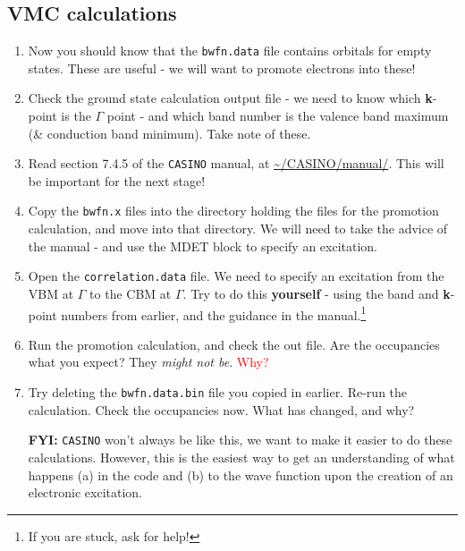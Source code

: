 \documentclass[12pt, a4paper]{article}
\begin{document}
\subsection{VMC calculations}\label{sub:vmc_calculations_2}

\begin{enumerate}
  \item Now you should know that the \texttt{bwfn.data} file contains orbitals
  for empty states. These are useful - we will want to promote electrons into
  these!

  \item Check the ground state calculation output file - we need to know which
  {\bf k}-point is the $\Gamma$ point - and which band number is the valence band
  maximum (\& conduction band minimum). Take note of these.

  \item Read section 7.4.5 of the \texttt{CASINO} manual, at
  \url{~/CASINO/manual/}. This will be important for the next stage!

  \item Copy the \texttt{bwfn.x} files into the directory holding the files for
  the promotion calculation, and move into that directory. We will need to take
  the advice of the manual - and use the MDET block to specify an excitation.

  \item Open the \texttt{correlation.data} file. We need to specify an
  excitation from the VBM at $\Gamma$ to the CBM at $\Gamma$. Try to do this
  \textbf{yourself} - using the band and {\bf k}-point numbers from
  earlier, and the guidance in the manual.\footnote{If you are stuck, ask for
  help!}

  \item Run the promotion calculation, and check the out file. Are the
  occupancies what you expect? They \textit{might not be}. \textcolor{red}{Why?}

  \item Try deleting the \texttt{bwfn.data.bin} file you copied in earlier.
  Re-run the calculation. Check the occupancies now. What has changed, and why?

  \item[{\bf FYI:}] \texttt{CASINO} won't always be like this, we want to make
  it easier to do these calculations. However, this is the easiest way to get
  an understanding of what happens (a) in the code and (b) to the wave
  function upon the creation of an electronic excitation.
\end{enumerate}
\end{document}
